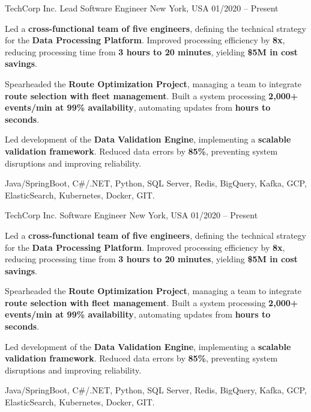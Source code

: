 \documentclass[]{awesome-cv}
\begin{document}

\begin{cventries}

  \cventry
    {TechCorp Inc.}  
    {Lead Software Engineer}  
    {New York, USA}  
    {01/2020 -- Present}  
    {%
      \begin{cvitems}
        \item {Led a \textbf{cross-functional team of five engineers}, defining the technical strategy for the \textbf{Data Processing Platform}. Improved processing efficiency by \textbf{8x}, reducing processing time from \textbf{3 hours to 20 minutes}, yielding \textbf{\$5M in cost savings}.}
        \item {Spearheaded the \textbf{Route Optimization Project}, managing a team to integrate \textbf{route selection with fleet management}. Built a system processing \textbf{2,000+ events/min at 99\% availability}, automating updates from \textbf{hours to seconds}.}
        \item {Led development of the \textbf{Data Validation Engine}, implementing a \textbf{scalable validation framework}. Reduced data errors by \textbf{85\%}, preventing system disruptions and improving reliability.}
      \end{cvitems}
    }
    {Java/SpringBoot, C\#/.NET, Python, SQL Server, Redis, BigQuery, Kafka, GCP, ElasticSearch, Kubernetes, Docker, GIT.}

  \cventry
  {TechCorp Inc.}  
  {Software Engineer}  
  {New York, USA}  
  {01/2020 -- Present}  
  {%
    \begin{cvitems}
      \item {Led a \textbf{cross-functional team of five engineers}, defining the technical strategy for the \textbf{Data Processing Platform}. Improved processing efficiency by \textbf{8x}, reducing processing time from \textbf{3 hours to 20 minutes}, yielding \textbf{\$5M in cost savings}.}
      \item {Spearheaded the \textbf{Route Optimization Project}, managing a team to integrate \textbf{route selection with fleet management}. Built a system processing \textbf{2,000+ events/min at 99\% availability}, automating updates from \textbf{hours to seconds}.}
      \item {Led development of the \textbf{Data Validation Engine}, implementing a \textbf{scalable validation framework}. Reduced data errors by \textbf{85\%}, preventing system disruptions and improving reliability.}
    \end{cvitems}
  }
  {Java/SpringBoot, C\#/.NET, Python, SQL Server, Redis, BigQuery, Kafka, GCP, ElasticSearch, Kubernetes, Docker, GIT.}
\end{cventries}
\end{document}
